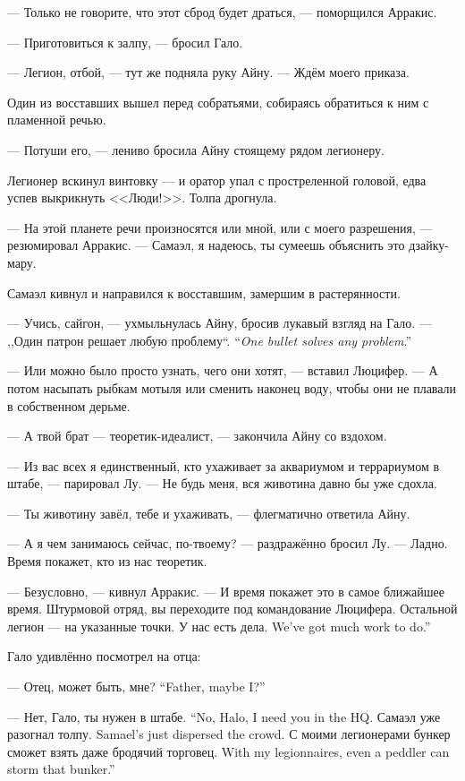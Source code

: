 --- Только не говорите, что этот сброд будет драться, --- поморщился Арракис.

--- Приготовиться к залпу, --- бросил Гало.

--- Легион, отбой, --- тут же подняла руку Айну.
--- Ждём моего приказа.

Один из восставших вышел перед собратьями, собираясь обратиться к ним с пламенной речью.

--- Потуши его, --- лениво бросила Айну стоящему рядом легионеру.

Легионер вскинул винтовку --- и оратор упал с простреленной головой, едва успев выкрикнуть <<Люди!>>.
Толпа дрогнула.

--- На этой планете речи произносятся или мной, или с моего разрешения, --- резюмировал Арракис.
--- Самаэл, я надеюсь, ты сумеешь объяснить это дзайку-мару.

Самаэл кивнул и направился к восставшим, замершим в растерянности.

--- Учись, сайгон, --- ухмыльнулась Айну, бросив лукавый взгляд на Гало.
{--- ,,Один патрон решает любую проблему``\footnotemark.}
{``\textit{One bullet solves any problem}\footnotemark.''}

--- Или можно было просто узнать, чего они хотят, --- вставил Люцифер.
--- А потом насыпать рыбкам мотыля или сменить наконец воду, чтобы они не плавали в собственном дерьме.

--- А твой брат --- теоретик-идеалист, --- закончила Айну со вздохом.

--- Из вас всех я единственный, кто ухаживает за аквариумом и террариумом в штабе, --- парировал Лу.
--- Не будь меня, вся животина давно бы уже сдохла.

--- Ты животину завёл, тебе и ухаживать, --- флегматично ответила Айну.

--- А я чем занимаюсь сейчас, по-твоему? --- раздражённо бросил Лу.
--- Ладно.
Время покажет, кто из нас теоретик.

--- Безусловно, --- кивнул Арракис.
--- И время покажет это в самое ближайшее время.
Штурмовой отряд, вы переходите под командование Люцифера.
Остальной легион --- на указанные точки.
{У нас есть дела.}
{We've got much work to do.''}

Гало удивлённо посмотрел на отца:

{--- Отец, может быть, мне?}
{``Father, maybe I?''}

{--- Нет, Гало, ты нужен в штабе.}
{``No, Halo, I need you in the HQ.}
{Самаэл уже разогнал толпу.}
{Samael's just dispersed the crowd.}
{С моими легионерами бункер сможет взять даже бродячий торговец.}
{With my legionnaires, even a peddler can storm that bunker.''}

